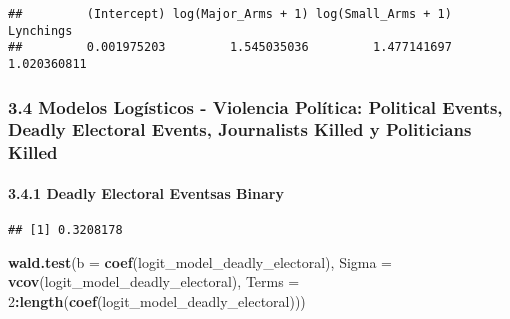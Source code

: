 \documentclass[
  11pt,
]{article}
\newenvironment{Shaded}{\begin{snugshade}}{\end{snugshade}}
\newcommand{\AttributeTok}[1]{\textcolor[rgb]{0.13,0.29,0.53}{#1}}
\newcommand{\DecValTok}[1]{\textcolor[rgb]{0.00,0.00,0.81}{#1}}
\newcommand{\FunctionTok}[1]{\textcolor[rgb]{0.13,0.29,0.53}{\textbf{#1}}}
\newcommand{\NormalTok}[1]{#1}
\newcommand{\OtherTok}[1]{\textcolor[rgb]{0.56,0.35,0.01}{#1}}
\newcommand{\SpecialCharTok}[1]{\textcolor[rgb]{0.81,0.36,0.00}{\textbf{#1}}}
\begin{document}
\begin{verbatim}
##         (Intercept) log(Major_Arms + 1) log(Small_Arms + 1)           Lynchings 
##         0.001975203         1.545035036         1.477141697         1.020360811
\end{verbatim}

\subsubsection{3.4 Modelos Logísticos - Violencia Política: Political
Events, Deadly Electoral Events, Journalists Killed y Politicians
Killed}\label{modelos-loguxedsticos---violencia-poluxedtica-political-events-deadly-electoral-events-journalists-killed-y-politicians-killed}

\paragraph{3.4.1 Deadly Electoral Eventsas
Binary}\label{deadly-electoral-eventsas-binary}

\begin{Shaded}
\end{Shaded}

\begin{verbatim}
## [1] 0.3208178
\end{verbatim}

\begin{Shaded}
\begin{Highlighting}[]
\FunctionTok{wald.test}\NormalTok{(}\AttributeTok{b =} \FunctionTok{coef}\NormalTok{(logit\_model\_deadly\_electoral), }\AttributeTok{Sigma =} \FunctionTok{vcov}\NormalTok{(logit\_model\_deadly\_electoral), }\AttributeTok{Terms =} \DecValTok{2}\SpecialCharTok{:}\FunctionTok{length}\NormalTok{(}\FunctionTok{coef}\NormalTok{(logit\_model\_deadly\_electoral)))}
\end{Highlighting}
\end{Shaded}
\end{document}

